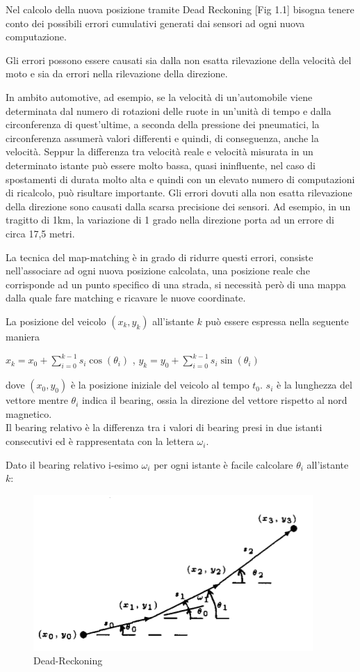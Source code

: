 \documentclass[12pt,a4paper,openright,twoside]{report}
\begin{document}
Nel calcolo della nuova posizione tramite Dead Reckoning [Fig 1.1] bisogna tenere conto dei possibili errori cumulativi generati dai sensori ad ogni nuova computazione. 

Gli errori possono essere causati sia dalla non esatta rilevazione della velocità del moto e sia da errori nella rilevazione della direzione.

In ambito automotive, ad esempio, se la velocità di un'automobile viene determinata dal numero di rotazioni delle ruote in un'unità di tempo e dalla circonferenza di quest'ultime, a seconda della pressione dei pneumatici, la circonferenza assumerà valori differenti e quindi, di conseguenza, anche la velocità. 
Seppur la differenza tra velocità reale e velocità misurata in un determinato istante può essere molto bassa, quasi ininfluente, nel caso di spostamenti di durata molto alta e quindi con un elevato numero di computazioni di ricalcolo, può risultare importante.
Gli errori dovuti alla non esatta rilevazione della direzione sono causati dalla scarsa precisione dei sensori. Ad esempio, in un tragitto di 1km, la variazione di 1 grado nella direzione porta ad un errore di circa 17,5 metri.


La tecnica del map-matching \cite{K7} è in grado di ridurre questi errori, consiste nell'associare ad ogni nuova posizione calcolata, una posizione reale che corrisponde ad un punto specifico di una strada, si necessità però di una mappa dalla quale fare matching e ricavare le nuove coordinate.

La posizione del veicolo $(x_k, y_k)$ all'istante $k$ può essere espressa nella seguente maniera \cite{K8}
\begin{center}
$x_k = x_0 + \sum_{i=0}^{k-1} s_i  \cos( \theta_i) $ ,      $y_k = y_0 + \sum_{i=0}^{k-1} s_i  \sin( \theta_i)  $
\end{center}
dove $(x_0, y_0)$ è la posizione iniziale del veicolo al tempo $t_0 $. $s_i$ è la lunghezza del vettore mentre $ \theta_i $ indica il bearing, ossia la direzione del vettore rispetto al nord magnetico.\\
Il bearing relativo è la differenza tra i valori di bearing presi in due istanti consecutivi ed è rappresentata con la lettera $\omega_i $.

Dato il bearing relativo i-esimo $\omega_i$ per ogni istante è facile calcolare $\theta_i$ all'istante $k$:

\begin{figure}[h] 
\centering 
\includegraphics[scale=0.8]{fig1} 
\caption{Dead-Reckoning} 
\end{figure}
\end{document}
